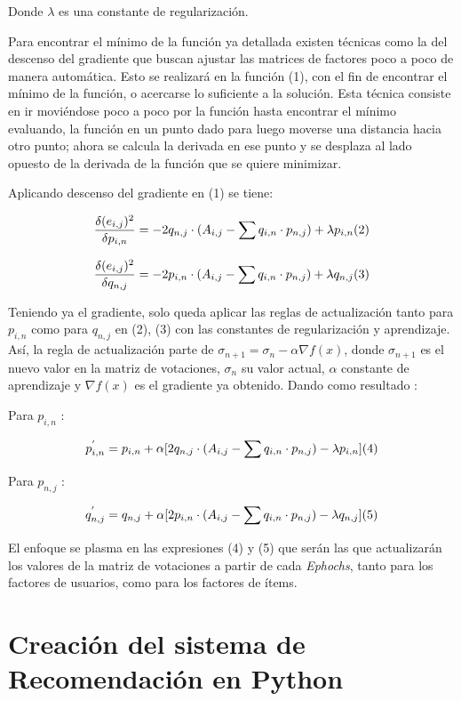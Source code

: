 \documentclass{article}
\begin{document}
Donde $\lambda$ es una constante de regularización.

Para encontrar el mínimo de la función ya detallada 
existen técnicas como la del descenso del gradiente que 
buscan ajustar las matrices de factores poco a 
poco de manera automática. Esto se realizará en la 
función (1), con el fin de encontrar el mínimo de 
la función, o acercarse lo suficiente a la solución. Esta técnica consiste en ir 
moviéndose poco a poco por la función hasta encontrar el mínimo evaluando, la función en un punto dado para 
luego moverse una distancia hacia otro punto; 
ahora se calcula la derivada en ese punto y 
se desplaza al lado opuesto de la derivada de 
la función que se quiere minimizar.

Aplicando descenso del gradiente en (1) se tiene:

$$
\frac{\delta(e_{i, j})^2}{\delta p_{i, n}} = -2q_{n, j}\cdot (A_{i, j} - \sum q_{i, n}\cdot p_{n, j}) + \lambda p_{i, n} \space (2)
$$

$$
\frac{\delta(e_{i, j})^2}{\delta q_{n, j}} = -2p_{i, n}\cdot (A_{i, j} - \sum q_{i, n}\cdot p_{n, j}) + \lambda q_{n, j} \space (3)
$$

Teniendo ya el gradiente, solo queda 
aplicar las reglas de actualización tanto para $p_{i, n}$
como para $q_{n, j}$ en (2), (3) con las constantes de 
regularización y aprendizaje. Así, la regla de 
actualización parte de $\sigma_{n + 1} = \sigma_{n} - \alpha \nabla f(x)$, donde $\sigma_{n + 1}$ es el nuevo valor en la matriz de votaciones, $\sigma_{n}$ su valor actual, $\alpha$ constante de aprendizaje y $\nabla f(x)$ es el gradiente ya obtenido. Dando como resultado :

Para $p_{i, n}$ :

$$
p_{i, n}^{'} = p_{i, n} + \alpha[2q_{n, j}\cdot (A_{i, j} - \sum q_{i, n}\cdot p_{n, j}) - \lambda p_{i, n}] \space (4)
$$

Para $p_{n, j}$ :

$$
q_{n, j}^{'} = q_{n, j} + \alpha[2p_{i, n}\cdot (A_{i, j} - \sum q_{i, n}\cdot p_{n, j}) - \lambda q_{n, j}] \space (5)
$$

El enfoque se plasma en las expresiones (4) y 
(5) que serán las que actualizarán los valores de 
la matriz de votaciones a partir de cada \textit{Ephochs}, 
tanto para los factores de usuarios, como para los 
factores de ítems.


\section{Creación del sistema de Recomendación en Python}
\end{document}
